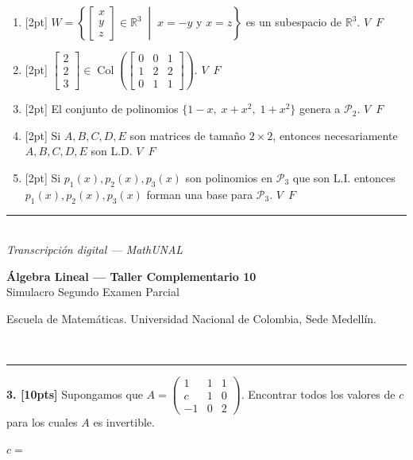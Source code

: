 \documentclass[11pt]{article}
\newcommand{\examheader}{%
  \noindent
  \begin{minipage}[t]{0.6\linewidth}
    {\small\bfseries Álgebra Lineal --- Taller Complementario 10}\\
    {\small Simulacro Segundo Examen Parcial}
  \end{minipage}%
  \hfill
  \begin{minipage}[t]{0.35\linewidth}
    \raggedleft\small Escuela de Matemáticas. Universidad Nacional de Colombia, Sede Medellín.
  \end{minipage}\\[2pt]
  \rule{\linewidth}{0.6pt}
}
\newcommand{\examfooter}{%
  \vfill
  \rule{\linewidth}{0.4pt}\\[1pt]
  {\scriptsize\textit{Transcripción digital --- MathUNAL}\hfill\textcolor{unalblue}{\textbf{\thepage}}}
}
\begin{document}
\begin{enumerate}[label=\alph*)]
\item{}[2pt] $W = \left\{ \begin{bmatrix}x\\y\\z\end{bmatrix} \in \mathbb{R}^3 \;\middle|\; x=-y \text{ y } x=z \right\}$ es un subespacio de $\mathbb{R}^3$. \hfill \mbox{$\boxed{V}$ $\boxed{F}$}

\vspace{0.3cm}
\item{}[2pt] $\begin{bmatrix}2\\2\\3\end{bmatrix} \in \operatorname{Col}\left(\begin{bmatrix} 0&0&1\\1&2&2\\0&1&1 \end{bmatrix}\right)$. \hfill \mbox{$\boxed{V}$ $\boxed{F}$}

\vspace{0.3cm}
\item{}[2pt] El conjunto de polinomios $\{1-x,\; x+x^2,\; 1+x^2\}$ genera a $\mathcal{P}_2$. \hfill \mbox{$\boxed{V}$ $\boxed{F}$}

\vspace{0.3cm}
\item{}[2pt] Si $A,B,C,D,E$ son matrices de tamaño $2\times 2$, entonces necesariamente $A,B,C,D,E$ son L.D. \hfill \mbox{$\boxed{V}$ $\boxed{F}$}

\vspace{0.3cm}
\item{}[2pt] Si $p_1(x), p_2(x), p_3(x)$ son polinomios en $\mathcal{P}_3$ que son L.I. entonces $p_1(x), p_2(x), p_3(x)$ forman una base para $\mathcal{P}_3$. \hfill \mbox{$\boxed{V}$ $\boxed{F}$}
\end{enumerate}

\examfooter
\newpage

\examheader

\textbf{3. [10pts]} Supongamos que $A = \begin{pmatrix} 1 & 1 & 1 \\ c & 1 & 0 \\ -1 & 0 & 2 \end{pmatrix}$. Encontrar todos los valores de $c$ para los cuales $A$ es invertible.

\vspace{0.3cm}
\noindent $c = $
\end{document}
